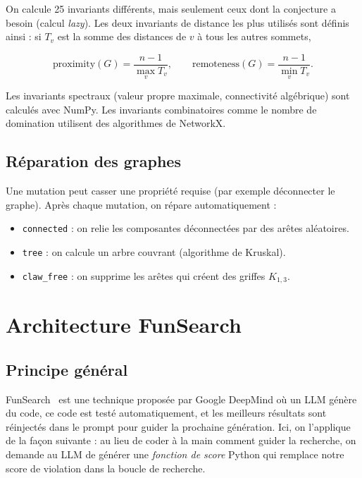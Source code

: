 \documentclass[12pt,a4paper]{article}
\begin{document}
On calcule 25 invariants différents, mais seulement ceux dont la conjecture
a besoin (calcul \emph{lazy}).  Les deux invariants de distance les plus utilisés
sont définis ainsi : si $T_v$ est la somme des distances de $v$ à tous les autres
sommets,

\[
  \mathrm{proximity}(G) = \frac{n-1}{\max_{v} T_v}, \qquad
  \mathrm{remoteness}(G) = \frac{n-1}{\min_{v} T_v}.
\]

Les invariants spectraux (valeur propre maximale, connectivité algébrique) sont
calculés avec NumPy.  Les invariants combinatoires comme le nombre de domination
utilisent des algorithmes de NetworkX.

\subsection{Réparation des graphes}

Une mutation peut casser une propriété requise (par exemple déconnecter le graphe).
Après chaque mutation, on répare automatiquement :

\begin{itemize}
  \item \texttt{connected} : on relie les composantes déconnectées par des arêtes aléatoires.
  \item \texttt{tree} : on calcule un arbre couvrant (algorithme de Kruskal).
  \item \texttt{claw\_free} : on supprime les arêtes qui créent des griffes $K_{1,3}$.
\end{itemize}

\section{Architecture FunSearch}

\subsection{Principe général}

FunSearch~\cite{romera2024mathematical} est une technique proposée par Google
DeepMind où un LLM génère du code, ce code est testé automatiquement, et les
meilleurs résultats sont réinjectés dans le prompt pour guider la prochaine
génération.  Ici, on l'applique de la façon suivante : au lieu de coder à la
main comment guider la recherche, on demande au LLM de générer une
\emph{fonction de score} Python qui remplace notre score de violation dans la
boucle de recherche.
\end{document}
